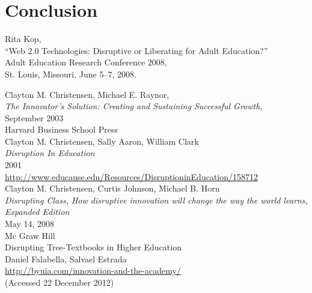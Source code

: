 \documentclass[a4paper,10pt]{book}
\begin{document}
\section{Conclusion}


\begin{thebibliography}{9}




  Rita Kop, \\
  “Web 2.0 Technologies: Disruptive or Liberating for Adult Education?” \\
  Adult Education Research Conference 2008, \\
  St. Louis, Missouri, June 5–7, 2008.

   Clayton M. Christensen, Michael E. Raynor,\\
   \emph{The Innovator's Solution: Creating and Sustaining Successful Growth},\\
   September 2003 \\
   Harvard Business School Press\\
 
   Clayton M. Christensen, Sally Aaron, William Clark\\
   \emph{Disruption In Education}\\
    2001\\
   \url{http://www.educause.edu/Resources/DisruptioninEducation/158712}\\

    
   Clayton M. Christensen, Curtis Johnson, Michael B. Horn\\
   \emph{Disrupting Class, How disruptive innovation will change the way the world learns, Expanded Edition}\\
    May 14, 2008\\
    Mc Graw Hill\\

  Disrupting Tree-Textbooks in Higher Education\\
  Daniel Falabella, Salvael Estrada\\
  \url{http://byuia.com/innovation-and-the-academy/}\\
   (Accessed 22 December 2012)


\end{thebibliography}
\end{document}
